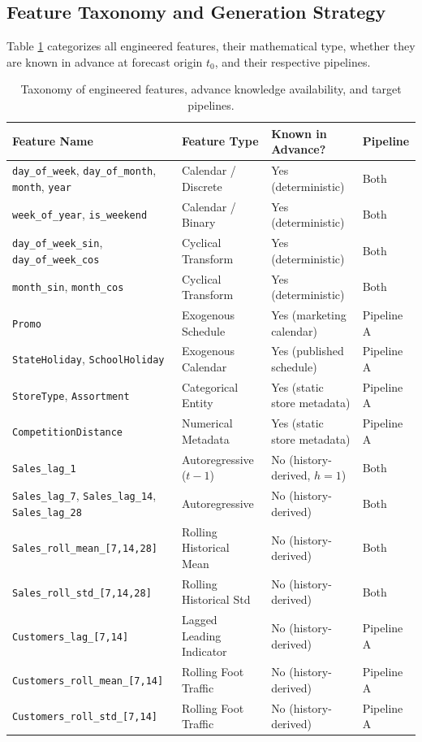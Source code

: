 \documentclass[11pt,a4paper]{article}
\begin{document}
\subsection{Feature Taxonomy and Generation Strategy}
Table \ref{tab:feature_taxonomy} categorizes all engineered features, their mathematical type, whether they are known in advance at forecast origin $t_0$, and their respective pipelines.

\begin{table}[H]
    \centering
    \small
    \begin{tabular}{llll}
        \toprule
        \textbf{Feature Name} & \textbf{Feature Type} & \textbf{Known in Advance?} & \textbf{Pipeline} \\
        \midrule
        \texttt{day\_of\_week}, \texttt{day\_of\_month}, \texttt{month}, \texttt{year} & Calendar / Discrete & Yes (deterministic) & Both \\
        \texttt{week\_of\_year}, \texttt{is\_weekend} & Calendar / Binary & Yes (deterministic) & Both \\
        \texttt{day\_of\_week\_sin}, \texttt{day\_of\_week\_cos} & Cyclical Transform & Yes (deterministic) & Both \\
        \texttt{month\_sin}, \texttt{month\_cos} & Cyclical Transform & Yes (deterministic) & Both \\
        \texttt{Promo} & Exogenous Schedule & Yes (marketing calendar) & Pipeline A \\
        \texttt{StateHoliday}, \texttt{SchoolHoliday} & Exogenous Calendar & Yes (published schedule) & Pipeline A \\
        \texttt{StoreType}, \texttt{Assortment} & Categorical Entity & Yes (static store metadata) & Pipeline A \\
        \texttt{CompetitionDistance} & Numerical Metadata & Yes (static store metadata) & Pipeline A \\
        \texttt{Sales\_lag\_1} & Autoregressive ($t-1$) & No (history-derived, $h=1$) & Both \\
        \texttt{Sales\_lag\_7}, \texttt{Sales\_lag\_14}, \texttt{Sales\_lag\_28} & Autoregressive & No (history-derived) & Both \\
        \texttt{Sales\_roll\_mean\_[7,14,28]} & Rolling Historical Mean & No (history-derived) & Both \\
        \texttt{Sales\_roll\_std\_[7,14,28]} & Rolling Historical Std & No (history-derived) & Both \\
        \texttt{Customers\_lag\_[7,14]} & Lagged Leading Indicator & No (history-derived) & Pipeline A \\
        \texttt{Customers\_roll\_mean\_[7,14]} & Rolling Foot Traffic & No (history-derived) & Pipeline A \\
        \texttt{Customers\_roll\_std\_[7,14]} & Rolling Foot Traffic & No (history-derived) & Pipeline A \\
        \bottomrule
    \end{tabular}
    \caption{Taxonomy of engineered features, advance knowledge availability, and target pipelines.}
    \label{tab:feature_taxonomy}
\end{table}
\end{document}
